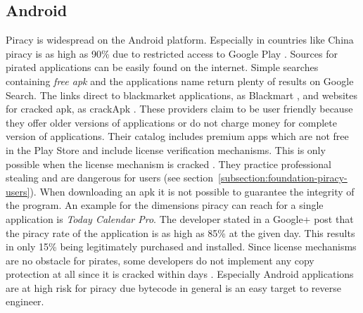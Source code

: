 \subsection{Android} \label{subsection:foundation-piracy-android}
Piracy is widespread on the Android platform. Especially in countries like China piracy is as high as 90\% due to restricted access to Google Play \cite{piracyRate}.
Sources for pirated applications can be easily found on the internet.
Simple searches containing \textit{free apk} and the applications name return plenty of results on Google Search.
The links direct to blackmarket applications, as Blackmart \cite{blackmartStore}, and websites for cracked \gls{apk}, as crackApk \cite{crackApk}.
These providers claim to be user friendly because they offer older versions of applications or do not charge money for complete version of applications.
Their catalog includes premium apps which are not free in the Play Store and include license verification mechanisms.
This is only possible when the license mechanism is cracked \cite{apksfree}.
They practice professional stealing and are dangerous for users (see section~\ref{subsection:foundation-piracy-users}).
When downloading an \gls{apk} it is not possible to guarantee the integrity of the program.
\newline
An example for the dimensions piracy can reach for a single application is \textit{Today Calendar Pro}.
The developer stated in a Google+ post that the piracy rate of the application is as high as 85\% at the given day.
This results in only 15\% being legitimately purchased and installed. \cite{xdaPiracy} \cite{developersPiracy}
\newline
Since license mechanisms are no obstacle for pirates, some developers do not implement any copy protection at all since it is cracked within days \cite{recodeMonument}.
Especially Android applications are at high risk for piracy due bytecode in general is an easy target to reverse engineer.
